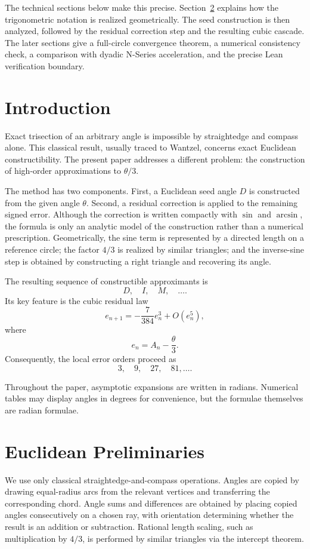 \documentclass[11pt]{article}
\theoremstyle{remark}
\begin{document}
The technical sections below make this precise. Section~\ref{sec:euclidean-preliminaries} explains how the trigonometric notation is realized geometrically. The seed construction is then analyzed, followed by the residual correction step and the resulting cubic cascade. The later sections give a full-circle convergence theorem, a numerical consistency check, a comparison with dyadic N-Series acceleration, and the precise Lean verification boundary.

\section{Introduction}

Exact trisection of an arbitrary angle is impossible by straightedge and compass alone. This classical result, usually traced to Wantzel, concerns exact Euclidean constructibility. The present paper addresses a different problem: the construction of high-order approximations to \(\theta/3\).

The method has two components. First, a Euclidean seed angle \(D\) is constructed from the given angle \(\theta\). Second, a residual correction is applied to the remaining signed error. Although the correction is written compactly with \(\sin\) and \(\arcsin\), the formula is only an analytic model of the construction rather than a numerical prescription. Geometrically, the sine term is represented by a directed length on a reference circle; the factor \(4/3\) is realized by similar triangles; and the inverse-sine step is obtained by constructing a right triangle and recovering its angle.

The resulting sequence of constructible approximants is
\[
D,\quad I,\quad M,\quad \ldots.
\]
Its key feature is the cubic residual law
\[
e_{n+1}
=
-\frac{7}{384}e_n^3+O(e_n^5),
\]
where
\[
e_n=A_n-\frac{\theta}{3}.
\]
Consequently, the local error orders proceed as
\[
3,\quad 9,\quad 27,\quad 81,\ldots .
\]

Throughout the paper, asymptotic expansions are written in radians. Numerical tables may display angles in degrees for convenience, but the formulae themselves are radian formulae.

\section{Euclidean Preliminaries}
\label{sec:euclidean-preliminaries}

We use only classical straightedge-and-compass operations. Angles are copied by drawing equal-radius arcs from the relevant vertices and transferring the corresponding chord. Angle sums and differences are obtained by placing copied angles consecutively on a chosen ray, with orientation determining whether the result is an addition or subtraction. Rational length scaling, such as multiplication by \(4/3\), is performed by similar triangles via the intercept theorem.
\end{document}
